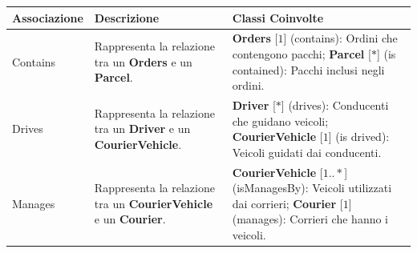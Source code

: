 \begin{tabularx}{\textwidth}{YYY}
  \toprule
  \textbf{Associazione} & \textbf{Descrizione} & \textbf{Classi Coinvolte} \\
  \midrule
  Contains &
  \begin{minipage}[c]{\linewidth}
    \vspace{0.5cm}
    Rappresenta la relazione tra un \textbf{Orders} e un \textbf{Parcel}. \newline
  \end{minipage} &
  \begin{minipage}[c]{\linewidth}
    \vspace{0.5cm}
    \textbf{Orders} [\(1\)]  (contains): Ordini che contengono pacchi; \newline
    \textbf{Parcel} [\(*\)] (is contained): Pacchi inclusi negli ordini. \newline
  \end{minipage} \\

  Drives &
  \begin{minipage}[c]{\linewidth}
    \vspace{0.5cm}
    Rappresenta la relazione tra un \textbf{Driver} e un \textbf{CourierVehicle}. \newline
  \end{minipage} &
  \begin{minipage}[c]{\linewidth}
    \vspace{0.5cm}
    \textbf{Driver} [\(*\)]  (drives):  Conducenti che guidano veicoli; \newline
    \textbf{CourierVehicle} [\(1\)] (is drived): Veicoli guidati dai conducenti. \newline
  \end{minipage} \\

  Manages &
  \begin{minipage}[c]{\linewidth}
    \vspace{0.5cm}
    Rappresenta la relazione tra un \textbf{CourierVehicle} e un \textbf{Courier}. \newline
  \end{minipage} &
  \begin{minipage}[c]{\linewidth}
    \vspace{0.5cm}
    \textbf{CourierVehicle} [\(1..*\)]  (isManagesBy): Veicoli utilizzati dai corrieri; \newline
    \textbf{Courier} [\(1\)] (manages): Corrieri che hanno i veicoli. \newline
  \end{minipage} \\


\end{tabularx}
